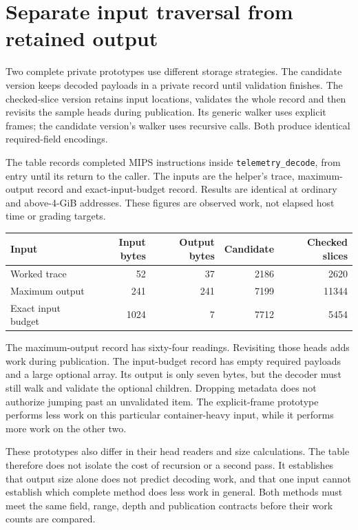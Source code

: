 \section{Separate input traversal from retained output}
Two complete private prototypes use different storage strategies. The candidate version
keeps decoded payloads in a private record until validation finishes. The checked-slice
version retains input locations, validates the whole record and then revisits the sample
heads during publication. Its generic walker uses explicit frames; the candidate
version's walker uses recursive calls. Both produce identical required-field encodings.

The table records completed MIPS instructions inside \texttt{telemetry\_decode}, from
entry until its return to the caller. The inputs are the helper's trace, maximum-output
record and exact-input-budget record. Results are identical at ordinary and above-4-GiB
addresses. These figures are observed work, not elapsed host time or grading targets.

\begin{center}
\begin{tabular}{lrrrr}
Input & Input bytes & Output bytes & Candidate & Checked slices \\
\hline
Worked trace & 52 & 37 & 2186 & 2620 \\
Maximum output & 241 & 241 & 7199 & 11344 \\
Exact input budget & 1024 & 7 & 7712 & 5454 \\
\end{tabular}
\end{center}

The maximum-output record has sixty-four readings. Revisiting those heads adds work
during publication. The input-budget record has empty required payloads and a large
optional array. Its output is only seven bytes, but the decoder must still walk and
validate the optional children. Dropping metadata does not authorize jumping past an
unvalidated item. The explicit-frame prototype performs less work on this particular
container-heavy input, while it performs more work on the other two.

These prototypes also differ in their head readers and size calculations. The table
therefore does not isolate the cost of recursion or a second pass. It establishes that
output size alone does not predict decoding work, and that one input cannot establish
which complete method does less work in general. Both methods must meet the same field,
range, depth and publication contracts before their work counts are compared.
